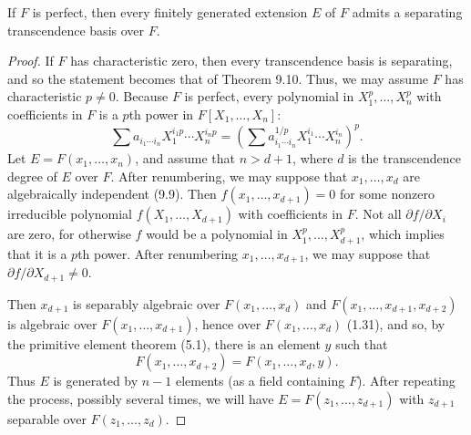 \begin{theorem}[9.27]
If $F$ is perfect, then every finitely generated extension $E$ of $F$ admits a separating transcendence basis over $F$.
\end{theorem}
\begin{proof}
If $F$ has characteristic zero, then every transcendence basis is separating, and so the statement becomes that of Theorem 9.10. Thus, we may assume $F$ has characteristic $p\ne0$. Because $F$ is perfect, every polynomial in $X_1^p,\ldots,X_n^p$ with coefficients in $F$ is a $p$th power in $F[X_1,\ldots,X_n]$:
\[\sum a_{i_1\cdots i_n}X_1^{i_1p}\cdots X_n^{i_np}
=\left(\sum a_{i_1\cdots i_n}^{1/p}X_1^{i_1}\cdots X_n^{i_n}\right)^p.\]
Let $E=F(x_1,\ldots,x_n)$, and assume that $n>d+1$, where $d$ is the transcendence degree of $E$ over $F$. After renumbering, we may suppose that $x_1,\ldots,x_d$ are algebraically independent (9.9). Then $f(x_1,\ldots,x_{d+1})=0$ for some nonzero irreducible polynomial $f(X_1,\ldots,X_{d+1})$ with coefficients in $F$. Not all $\partial f/\partial X_i$ are zero, for otherwise $f$ would be a polynomial in $X_1^p,\ldots,X_{d+1}^p$, which implies that it is a $p$th power. After renumbering $x_1,\ldots,x_{d+1}$, we may suppose that $\partial f/\partial X_{d+1}\ne0$.

Then $x_{d+1}$ is separably algebraic over $F(x_1,\ldots,x_d)$ and $F(x_1,\ldots,x_{d+1},x_{d+2})$ is algebraic over $F(x_1,\ldots,x_{d+1})$, hence over $F(x_1,\ldots,x_d)$ (1.31), and so, by the primitive element theorem (5.1), there is an element $y$ such that
\[F(x_1,\ldots,x_{d+2})=F(x_1,\ldots,x_d,y).\]
Thus $E$ is generated by $n-1$ elements (as a field containing $F$). After repeating the process, possibly several times, we will have $E=F(z_1,\ldots,z_{d+1})$ with $z_{d+1}$ separable over $F(z_1,\ldots,z_d)$.
\end{proof}
